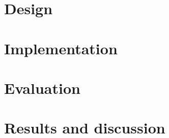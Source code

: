 
% 

% 

\section{Design}\label{sec:opal-design}


\section{Implementation}\label{sec:opal-impl}


\section{Evaluation}\label{sec:opal-evaluation}


\section{Results and discussion}\label{sec:opal-results}


